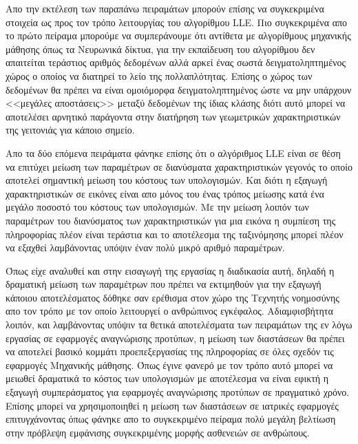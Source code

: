 \par
Απο την εκτέλεση των παραπάνω πειραμάτων μπορούν επίσης να συγκεκριμένα στοιχεία ως προς τον τρόπο λειτουργίας του αλγορίθμου \textlatin{LLE}. Πιο συγκεκριμένα απο το πρώτο πείραμα μπορούμε να συμπεράνουμε ότι αντίθετα με αλγορίθμους μηχανικής μάθησης όπως τα Νευρωνικά δίκτυα, για την εκπαίδευση του αλγορίθμου δεν απαιτείται τεράστιος αριθμός δεδομένων αλλά αρκεί ένας σωστά δειγματοληπτημένος χώρος ο οποίος να διατηρεί το λείο της πολλαπλότητας. Επίσης ο χώρος των δεδομένων θα πρέπει να είναι ομοιόμορφα δειγματοληπτημένος ώστε να μην υπάρχουν <<μεγάλες αποστάσεις>> μεταξύ δεδομένων της ίδιας κλάσης διότι αυτό μπορεί να αποτελέσει αρνητικό παράγοντα στην διατήρηση των γεωμετρικών χαρακτηριστικών της γειτονιάς για κάποιο σημείο.
\par
Απο τα δύο επόμενα πειράματα φάνηκε επίσης ότι ο αλγόριθμος \textlatin{LLE} είναι σε θέση να επιτύχει μείωση των παραμέτρων σε διανύσματα χαρακτηριστικών γεγονός το οποίο αποτελεί σημαντική μείωση του κόστους των υπολογισμών. Και διότι η εξαγωγή χαρακτηριστικών σε εικόνες είναι απο μόνος του ένας τρόπος μείωσης κατά ένα μεγάλο ποσοστό του κόστους των υπολογισμών. Με την μείωση λοιπόν των παραμέτρων του διανύσματος των χαρακτηριστικών για μια εικόνα η συμπίεση της πληροφορίας πλέον είναι τεράστια και το αποτέλεσμα της ταξινόμησης μπορεί πλέον να εξαχθεί λαμβάνοντας υπόψιν έναν πολύ μικρό αριθμό παραμέτρων. 
\par
Όπως είχε αναλυθεί και στην εισαγωγή της εργασίας η διαδικασία αυτή, δηλαδή η δραματική μείωση των παραμέτρων που πρέπει να εκτιμηθούν για την εξαγωγή κάποιου αποτελέσματος δόθηκε σαν ερέθισμα στον χώρο της Τεχνητής νοημοσύνης απο τον τρόπο με τον οποίο λειτουργεί ο ανθρώπινος εγκέφαλος. Αδιαμφισβήτητα λοιπόν, και λαμβάνοντας υπόψιν τα θετικά αποτελέσματα των πειραμάτων της εν λόγω εργασίας σε εφαρμογές αναγνώρισης προτύπων, η μείωση των διαστάσεων θα πρέπει να αποτελεί βασικό κομμάτι προεπεξεργασίας της πληροφορίας σε όλες σχεδόν τις εφαρμογές Μηχανικής μάθησης. Όπως έγινε φανερό με τον τρόπο αυτό μπορεί να μειωθεί δραματικά το κόστος των υπολογισμών με αποτέλεσμα να είναι εφικτή η εξαγωγή συμπεράσματος για εφαρμογές αναγνώρισης προτύπων σε πραγματικό χρόνο. Επίσης μπορεί να χρησιμοποιηθεί η μείωση των διαστάσεων σε ιατρικές εφαρμογές επιτυγχάνοντας όπως φάνηκε απο το συγκεκριμένο πείραμα πολύ μεγάλη βελτίωση στην πρόβλεψη εμφάνισης συγκεκριμένης μορφής ασθενειών σε ανθρώπους.
\par
